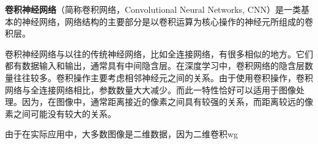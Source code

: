 
\textbf{卷积神经网络}（简称卷积网络，Convolutional Neural Networks, CNN）是一类基本的神经网络，网络结构的主要部分是以卷积运算为核心操作的神经元所组成的卷积层。

卷积神经网络与以往的传统神经网络，比如全连接网络，有很多相似的地方。它们都有数据输入和输出，通常具有中间隐含层。在深度学习中，卷积网络的隐含层数量往往较多。卷积操作主要考虑相邻神经元之间的关系。由于使用卷积操作，卷积网络与全连接网络相比，参数数量大大减少。而此一特性恰好可以适用于图像处理。因为，在图像中，通常距离接近的像素之间具有较强的关系，而距离较远的像素之间可能没有较大的关系。

由于在实际应用中，大多数图像是二维数据，因为二维卷积wg